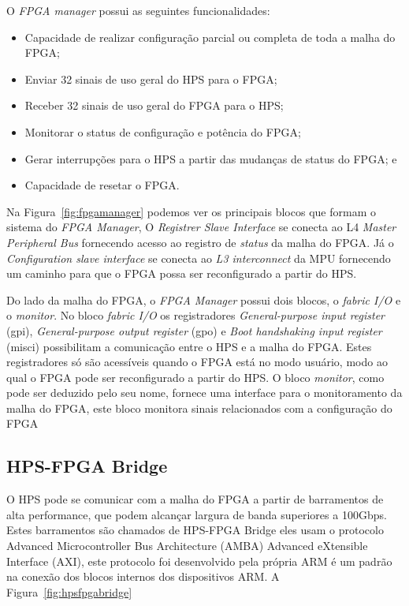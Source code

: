 O \textit{FPGA manager} possui as seguintes funcionalidades:

\begin{itemize}
    \item Capacidade de realizar configuração parcial ou completa de toda a malha do FPGA\@;
    \item Enviar 32 sinais de uso geral  do HPS para o FPGA\@;
    \item Receber 32 sinais de uso geral do FPGA para o HPS\@;
    \item Monitorar o status de configuração e potência do FPGA\@;
    \item Gerar interrupções para o HPS a partir das mudanças de status do FPGA\@; e
    \item Capacidade de resetar o FPGA\@.
\end{itemize}

Na Figura~\ref{fig:fpgamanager} podemos ver os principais blocos que formam o sistema do \textit{FPGA Manager}, O \textit{Registrer Slave Interface} se conecta ao L4 \textit{Master Peripheral Bus} fornecendo acesso ao registro de \textit{status} da malha do FPGA\@. Já o \textit{Configuration slave interface} se conecta ao \textit{L3 interconnect} da MPU fornecendo um caminho para que o FPGA possa ser reconfigurado a partir do HPS\@.

Do lado da malha do FPGA, o \textit{FPGA Manager} possui dois blocos, o \textit{fabric I/O} e o \textit{monitor}. No bloco \textit{fabric I/O} os registradores \textit{General-purpose input register} (gpi), \textit{General-purpose output register} (gpo) e \textit{Boot handshaking input register} (misci) possibilitam a comunicação entre o HPS e a malha do FPGA\@. Estes registradores só são acessíveis quando o FPGA está no modo usuário, modo ao qual o FPGA pode ser reconfigurado a partir do HPS\@. O bloco \textit{monitor}, como pode ser deduzido pelo seu nome, fornece uma interface para o monitoramento da malha do FPGA, este bloco monitora sinais relacionados com a configuração do FPGA 


\subsection{HPS-FPGA Bridge}
O HPS pode se comunicar com a malha do FPGA a partir de barramentos de alta performance, que podem alcançar largura de banda superiores a 100Gbps. Estes barramentos são chamados de HPS-FPGA Bridge eles usam o protocolo Advanced Microcontroller Bus Architecture (AMBA) Advanced eXtensible Interface (AXI), este protocolo foi desenvolvido pela própria ARM é um padrão na conexão dos blocos internos dos dispositivos ARM\@. A Figura~\ref{fig:hpsfpgabridge}

